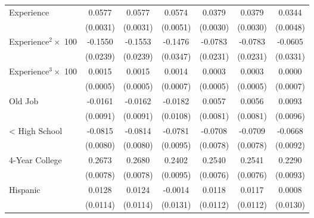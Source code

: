 {\begin{longtable}{l*{6}{c}}
Experience          &      0.0577\sym{***}&      0.0577\sym{***}&      0.0574\sym{***}&      0.0379\sym{***}&      0.0379\sym{***}&      0.0344\sym{***}\\
                    &    (0.0031)         &    (0.0031)         &    (0.0051)         &    (0.0030)         &    (0.0030)         &    (0.0048)         \\
Experience$^2\times$ 100&     -0.1550\sym{***}&     -0.1553\sym{***}&     -0.1476\sym{***}&     -0.0783\sym{***}&     -0.0783\sym{***}&     -0.0605\sym{*}  \\
                    &    (0.0239)         &    (0.0239)         &    (0.0347)         &    (0.0231)         &    (0.0231)         &    (0.0331)         \\
Experience$^3\times$ 100&      0.0015\sym{***}&      0.0015\sym{***}&      0.0014\sym{**} &      0.0003         &      0.0003         &      0.0000         \\
                    &    (0.0005)         &    (0.0005)         &    (0.0007)         &    (0.0005)         &    (0.0005)         &    (0.0007)         \\
Old Job             &     -0.0161\sym{*}  &     -0.0162\sym{*}  &     -0.0182\sym{*}  &      0.0057         &      0.0056         &      0.0093         \\
                    &    (0.0091)         &    (0.0091)         &    (0.0108)         &    (0.0081)         &    (0.0081)         &    (0.0096)         \\
< High School       &     -0.0815\sym{***}&     -0.0814\sym{***}&     -0.0781\sym{***}&     -0.0708\sym{***}&     -0.0709\sym{***}&     -0.0668\sym{***}\\
                    &    (0.0080)         &    (0.0080)         &    (0.0095)         &    (0.0078)         &    (0.0078)         &    (0.0092)         \\
4-Year College      &      0.2673\sym{***}&      0.2680\sym{***}&      0.2402\sym{***}&      0.2540\sym{***}&      0.2541\sym{***}&      0.2290\sym{***}\\
                    &    (0.0078)         &    (0.0078)         &    (0.0095)         &    (0.0076)         &    (0.0076)         &    (0.0093)         \\
Hispanic            &      0.0128         &      0.0124         &     -0.0014         &      0.0118         &      0.0117         &      0.0008         \\
                    &    (0.0114)         &    (0.0114)         &    (0.0131)         &    (0.0112)         &    (0.0112)         &    (0.0130)         \\

\end{longtable}}
